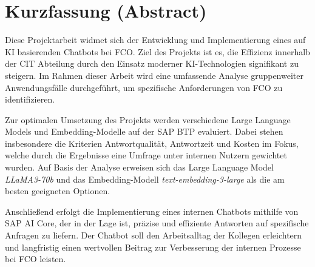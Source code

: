\chapter*{Kurzfassung (Abstract)}

Diese Projektarbeit widmet sich der Entwicklung und Implementierung eines auf \ac{KI} basierenden Chatbots bei \ac{FCO}.
Ziel des Projekts ist es, die Effizienz innerhalb der \ac{CIT} Abteilung durch den Einsatz moderner \ac{KI}-Technologien signifikant zu steigern.
Im Rahmen dieser Arbeit wird eine umfassende Analyse gruppenweiter Anwendungsfälle durchgeführt, um spezifische Anforderungen von \ac{FCO} zu identifizieren.

Zur optimalen Umsetzung des Projekts werden verschiedene Large Language Models und Embedding-Modelle auf der SAP \ac{BTP} evaluiert.
Dabei stehen insbesondere die Kriterien Antwortqualität, Antwortzeit und Kosten im Fokus, welche durch die Ergebnisse eine Umfrage unter internen Nutzern gewichtet wurden.
Auf Basis der Analyse erweisen sich das Large Language Model \textit{LLaMA3-70b} und das Embedding-Modell \textit{text-embedding-3-large} als die am besten geeigneten Optionen.

Anschließend erfolgt die Implementierung eines internen Chatbots mithilfe von SAP AI Core, der in der Lage ist, präzise und effiziente Antworten auf spezifische Anfragen zu liefern.
Der Chatbot soll den Arbeitsalltag der Kollegen erleichtern und langfristig einen wertvollen Beitrag zur Verbesserung der internen Prozesse bei \ac{FCO} leisten.
 